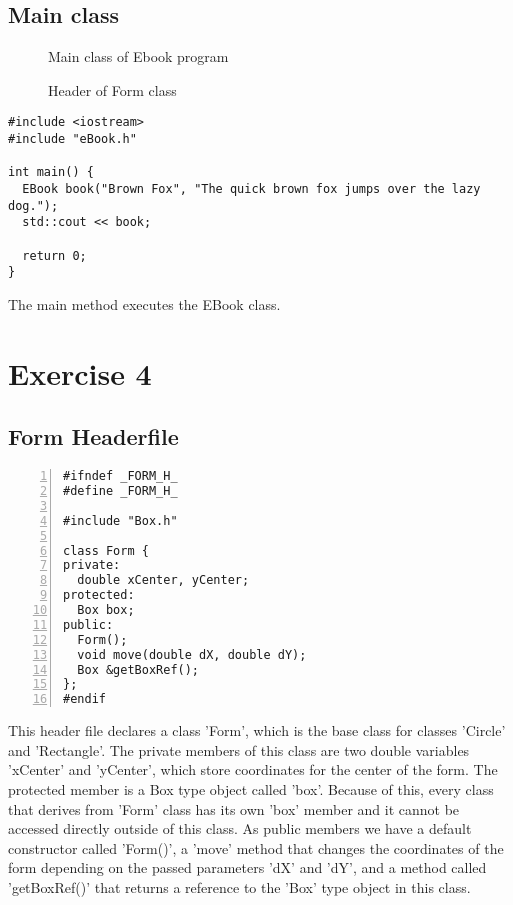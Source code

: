 \documentclass{article}
\begin{document}
\subsection{Main class}
\begin{figure}
  \scriptsize{\caption{Main class of Ebook program}}
  \scriptsize{\caption{Header of Form class}}
\end{figure}
\begin{lstlisting}
#include <iostream>
#include "eBook.h"

int main() {
  EBook book("Brown Fox", "The quick brown fox jumps over the lazy dog.");
  std::cout << book;

  return 0;
}
\end{lstlisting}
\normalsize{The main method executes the EBook class.}
\section{Exercise 4}

\subsection{Form Headerfile}
\begin{lstlisting}[basicstyle=\footnotesize\ttfamily, numbers=left, stepnumber=1, numberstyle = \normalsize]
#ifndef _FORM_H_
#define _FORM_H_

#include "Box.h"

class Form {
private:
  double xCenter, yCenter;
protected:
  Box box;
public:
  Form();
  void move(double dX, double dY);
  Box &getBoxRef();
};
#endif
\end{lstlisting}
\normalsize{This header file declares a class 'Form', which is the base class for classes 'Circle' and 'Rectangle'. The private members of this class are two double variables 'xCenter' and 'yCenter', which store coordinates for the center of the form.
The protected member is a Box type object called 'box'. Because of this, every class that derives from 'Form' class has its own 'box' member and it cannot be accessed directly outside of this class.
As public members we have a default constructor called 'Form()', a 'move' method that changes the coordinates of the form depending on the passed parameters 'dX' and 'dY', and a method called 'getBoxRef()' that returns a reference to the 'Box' type object in this class.

}\newpage%
\end{document}
